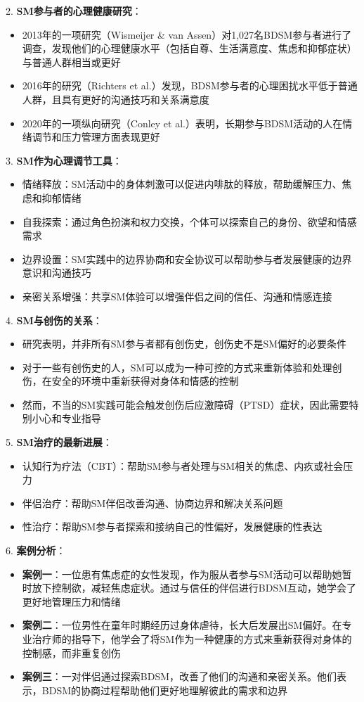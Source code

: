 \documentclass[12pt,UTF8]{ctexbook}
\begin{document}
2. \textbf{SM参与者的心理健康研究}：
  \begin{itemize}
  \item 2013年的一项研究（Wismeijer \& van Assen）对1,027名BDSM参与者进行了调查，发现他们的心理健康水平（包括自尊、生活满意度、焦虑和抑郁症状）与普通人群相当或更好
  \item 2016年的研究（Richters et al.）发现，BDSM参与者的心理困扰水平低于普通人群，且具有更好的沟通技巧和关系满意度
  \item 2020年的一项纵向研究（Conley et al.）表明，长期参与BDSM活动的人在情绪调节和压力管理方面表现更好
  \end{itemize}

3. \textbf{SM作为心理调节工具}：
  \begin{itemize}
  \item 情绪释放：SM活动中的身体刺激可以促进内啡肽的释放，帮助缓解压力、焦虑和抑郁情绪
  \item 自我探索：通过角色扮演和权力交换，个体可以探索自己的身份、欲望和情感需求
  \item 边界设置：SM实践中的边界协商和安全协议可以帮助参与者发展健康的边界意识和沟通技巧
  \item 亲密关系增强：共享SM体验可以增强伴侣之间的信任、沟通和情感连接
  \end{itemize}

4. \textbf{SM与创伤的关系}：
  \begin{itemize}
  \item 研究表明，并非所有SM参与者都有创伤史，创伤史不是SM偏好的必要条件
  \item 对于一些有创伤史的人，SM可以成为一种可控的方式来重新体验和处理创伤，在安全的环境中重新获得对身体和情感的控制
  \item 然而，不当的SM实践可能会触发创伤后应激障碍（PTSD）症状，因此需要特别小心和专业指导
  \end{itemize}

5. \textbf{SM治疗的最新进展}：
  \begin{itemize}
  \item 认知行为疗法（CBT）：帮助SM参与者处理与SM相关的焦虑、内疚或社会压力
  \item 伴侣治疗：帮助SM伴侣改善沟通、协商边界和解决关系问题
  \item 性治疗：帮助SM参与者探索和接纳自己的性偏好，发展健康的性表达
  \end{itemize}

6. \textbf{案例分析}：
  \begin{itemize}
  \item \textbf{案例一}：一位患有焦虑症的女性发现，作为服从者参与SM活动可以帮助她暂时放下控制欲，减轻焦虑症状。通过与信任的伴侣进行BDSM互动，她学会了更好地管理压力和情绪
  \item \textbf{案例二}：一位男性在童年时期经历过身体虐待，长大后发展出SM偏好。在专业治疗师的指导下，他学会了将SM作为一种健康的方式来重新获得对身体的控制感，而非重复创伤
  \item \textbf{案例三}：一对伴侣通过探索BDSM，改善了他们的沟通和亲密关系。他们表示，BDSM的协商过程帮助他们更好地理解彼此的需求和边界
  \end{itemize}
\end{document}
